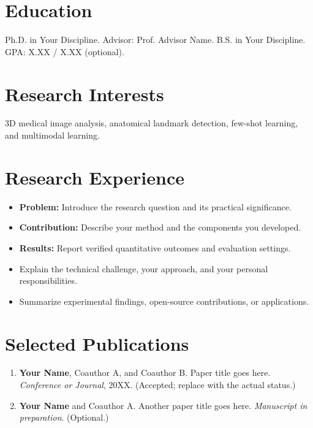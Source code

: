 \documentclass{resume}
\begin{document}
\section{Education}
Ph.D. in Your Discipline. Advisor: Prof. Advisor Name.
B.S. in Your Discipline. GPA: X.XX / X.XX (optional).
\section{Research Interests}
3D medical image analysis, anatomical landmark detection, few-shot learning,
and multimodal learning.
\section{Research Experience}
\begin{itemize}
\item \textbf{Problem:} Introduce the research question and its practical significance.
\item \textbf{Contribution:} Describe your method and the components you developed.
\item \textbf{Results:} Report verified quantitative outcomes and evaluation settings.
\end{itemize}
\begin{itemize}
\item Explain the technical challenge, your approach, and your personal responsibilities.
\item Summarize experimental findings, open-source contributions, or applications.
\end{itemize}
\section{Selected Publications}
\begin{enumerate}[leftmargin=1.5pc]
\item \textbf{Your Name}, Coauthor A, and Coauthor B. Paper title goes here.
\textit{Conference or Journal}, 20XX. (Accepted; replace with the actual status.)
\item \textbf{Your Name} and Coauthor A. Another paper title goes here.
\textit{Manuscript in preparation}. (Optional.)
\end{enumerate}
\end{document}
